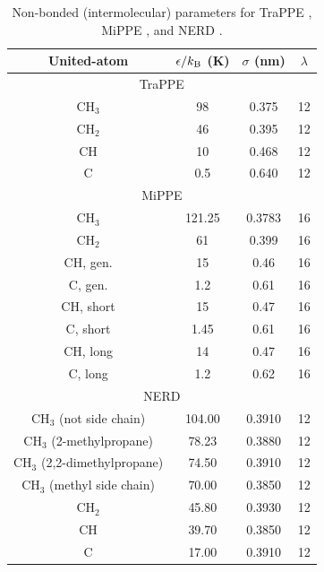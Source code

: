 \documentclass[journal=jced,manuscript=article]{achemso}
\begin{document}
    \begin{table}[h!]
		\caption{Non-bonded (intermolecular) parameters for TraPPE \cite{TraPPE,Martin1999}, MiPPE \cite{Mie,Potoff_branched}, and NERD \cite{NERD}.} \label{tab:nonbonded params}
		\begin{center}
			\begin{tabular}{|c|c|c|c|}
				\hline
				United-atom & $\epsilon/k_{\rm B}$ (K) & $\sigma$ (nm) & $\lambda$ \\ \hline
				\multicolumn{4}{|c|}{TraPPE} \\ \hline
				CH$_3$ & 98 & 0.375 & 12 \\ 
				CH$_2$ & 46 & 0.395 & 12\\ 
				CH & 10 & 0.468 & 12 \\
				C & 0.5 & 0.640 & 12 \\
				\hline
				\multicolumn{4}{|c|}{MiPPE} \\ \hline
				CH$_3$ & 121.25 & 0.3783 & 16  \\ 
				CH$_2$ & 61 & 0.399 & 16 \\ 
				CH, gen. & 15 & 0.46 & 16\\
				C, gen. & 1.2 & 0.61 & 16\\
				CH, short & 15 & 0.47 & 16\\
				C, short & 1.45 & 0.61 & 16\\
				CH, long & 14 & 0.47 & 16\\
				C, long & 1.2 & 0.62 & 16\\
				\hline
                \multicolumn{4}{|c|}{NERD} \\ \hline
				CH$_3$ (not side chain) & 104.00  & 0.3910 & 12\\ 
				CH$_3$ (2-methylpropane) & 78.23  & 0.3880 & 12\\ 
				CH$_3$ (2,2-dimethylpropane) & 74.50  & 0.3910 & 12 \\  
				CH$_3$ (methyl side chain) & 70.00 & 0.3850 & 12 \\
				CH$_2$ & 45.80 & 0.3930 & 12 \\ 
				CH & 39.70 & 0.3850 & 12\\
				C & 17.00 & 0.3910 & 12 \\
				\hline
			\end{tabular}
		\end{center} 
	\end{table}
    
\end{document}

